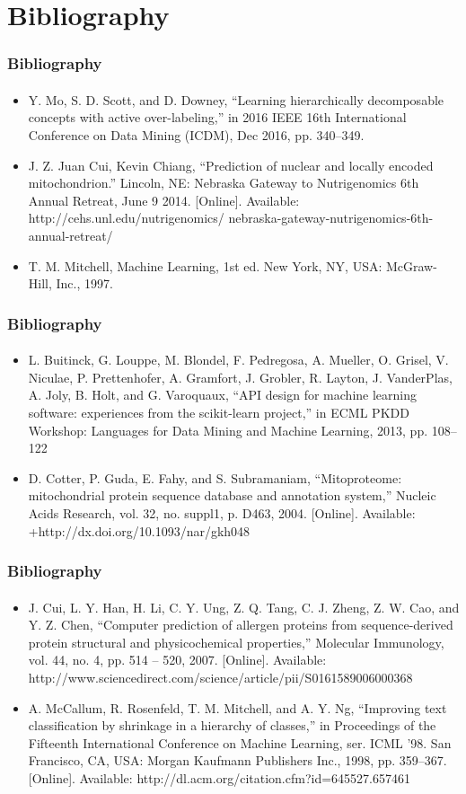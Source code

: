 \documentclass{beamer}
\begin{document}
\section{Bibliography}
\begin{frame}
    \frametitle{Bibliography}
    \framesubtitle{}
    \begin{itemize}
      \item Y. Mo, S. D. Scott, and D. Downey, “Learning hierarchically decomposable concepts with active over-labeling,” in 2016 IEEE 16th International Conference on Data Mining (ICDM), Dec 2016, pp. 340–349.
      \item J. Z. Juan Cui, Kevin Chiang, “Prediction of nuclear and locally encoded mitochondrion.” Lincoln, NE: Nebraska Gateway to Nutrigenomics 6th Annual Retreat, June 9 2014. [Online]. Available: http://cehs.unl.edu/nutrigenomics/ nebraska-gateway-nutrigenomics-6th-annual-retreat/
      \item T. M. Mitchell, Machine Learning, 1st ed. New York, NY, USA: McGraw-Hill, Inc., 1997.
    \end{itemize}
\end{frame}
\begin{frame}
    \frametitle{Bibliography}
    \framesubtitle{}
    \begin{itemize}
      \item L. Buitinck, G. Louppe, M. Blondel, F. Pedregosa, A. Mueller, O. Grisel, V. Niculae, P. Prettenhofer, A. Gramfort, J. Grobler, R. Layton, J. VanderPlas, A. Joly, B. Holt, and G. Varoquaux, “API design for machine learning software: experiences from the scikit-learn project,” in ECML PKDD Workshop: Languages for Data Mining and Machine Learning, 2013, pp. 108–122
      \item D. Cotter, P. Guda, E. Fahy, and S. Subramaniam, “Mitoproteome: mitochondrial protein sequence database and annotation system,” Nucleic Acids Research, vol. 32, no. suppl1, p. D463, 2004. [Online]. Available: +http://dx.doi.org/10.1093/nar/gkh048
    \end{itemize}
\end{frame}
\begin{frame}
    \frametitle{Bibliography}
    \framesubtitle{}
    \begin{itemize}
      \item J. Cui, L. Y. Han, H. Li, C. Y. Ung, Z. Q. Tang, C. J. Zheng, Z. W. Cao, and Y. Z. Chen, “Computer prediction of allergen proteins from sequence-derived protein structural and physicochemical properties,” Molecular Immunology, vol. 44, no. 4, pp. 514 – 520, 2007. [Online]. Available: http://www.sciencedirect.com/science/article/pii/S0161589006000368
      \item A. McCallum, R. Rosenfeld, T. M. Mitchell, and A. Y. Ng, “Improving text classification by shrinkage in a hierarchy of classes,” in Proceedings of the Fifteenth International Conference on Machine Learning, ser. ICML ’98. San Francisco, CA, USA: Morgan Kaufmann Publishers Inc., 1998, pp. 359–367. [Online]. Available: http://dl.acm.org/citation.cfm?id=645527.657461
    \end{itemize}
\end{frame}
\end{document}
